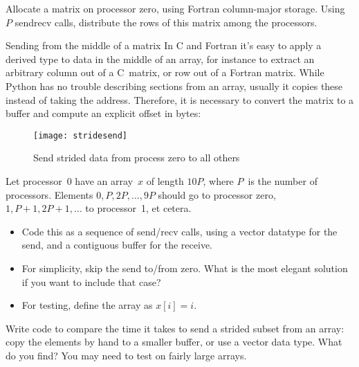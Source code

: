 \begin{exercise}
  \label{ex:col-to-row}
  Allocate a matrix on processor zero, using Fortran column-major storage.
  Using $P$ sendrecv calls, distribute the rows of this matrix among the
  processors.
\end{exercise}

\begin{pythonnote}{Sending from the middle of a matrix}
  In C and Fortran it's easy to apply a derived type
  to data in the middle of an array,
  for instance to extract an arbitrary column out of a C~matrix,
  or row out of a Fortran matrix.
  While Python has no trouble describing sections from an array,
  usually it copies these instead of taking the address.
  Therefore, it is necessary to convert the matrix
  to a buffer and compute an explicit offset in bytes:
\end{pythonnote}

\begin{figure}[t]
  \texttt{[image: stridesend]}
  \caption{Send strided data from process zero to all others}
  \label{fig:stridesend}
\end{figure}

\begin{exercise}
  \label{ex:stridesend}
  Let processor~0 have an array~$x$ of length $10P$, where $P$~is the number of processors.
  Elements $0,P,2P,\ldots,9P$ should go to processor zero, $1,P+1,2P+1,\ldots$ to processor~1,
  et cetera.
  \begin{itemize}
  \item
    Code this as a sequence of send/recv calls, using a vector datatype
    for the send, and a contiguous buffer for the receive.
  \item 
    For simplicity, skip the send to/from zero. What is the most elegant
    solution if you want to include that case?
  \item
    For testing, define the array as $x[i]=i$.
  \end{itemize}

\end{exercise}

\begin{exercise}
  Write code to compare the time it takes to send a strided subset
  from an array: copy the elements by hand to a smaller buffer, or use
  a vector data type. What do you find? You may need to test on fairly
  large arrays.
\end{exercise}

